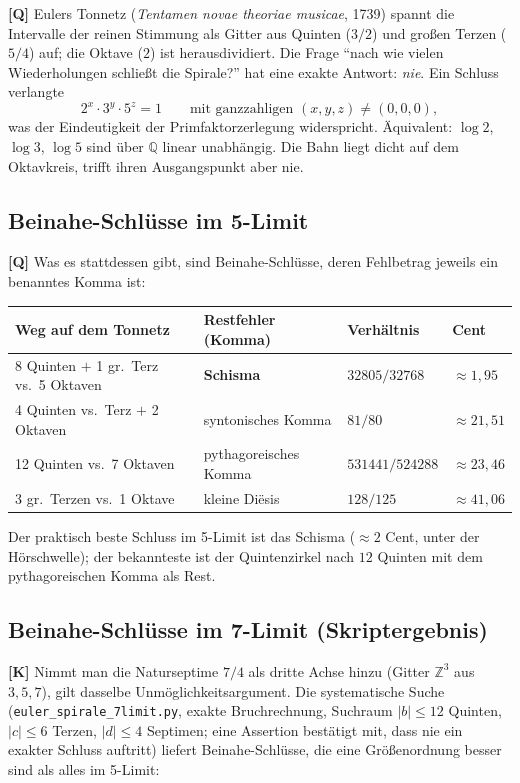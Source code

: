 \textbf{[Q]} Eulers Tonnetz (\emph{Tentamen novae theoriae musicae}, 1739)
spannt die Intervalle der reinen Stimmung als Gitter aus Quinten ($3/2$) und
gro\ss en Terzen ($5/4$) auf; die Oktave ($2$) ist herausdividiert. Die Frage
\enquote{nach wie vielen Wiederholungen schlie\ss t die Spirale?} hat eine
exakte Antwort: \emph{nie}. Ein Schluss verlangte
\[
  2^{x}\cdot 3^{y}\cdot 5^{z} = 1
  \qquad\text{mit ganzzahligen } (x,y,z)\neq(0,0,0),
\]
was der Eindeutigkeit der Primfaktorzerlegung widerspricht. \"Aquivalent:
$\log 2$, $\log 3$, $\log 5$ sind \"uber $\mathbb{Q}$ linear unabh\"angig. Die
Bahn liegt dicht auf dem Oktavkreis, trifft ihren Ausgangspunkt aber nie.

\subsection{Beinahe-Schl\"usse im 5-Limit}

\textbf{[Q]} Was es stattdessen gibt, sind Beinahe-Schl\"usse, deren
Fehlbetrag jeweils ein benanntes Komma ist:

\begin{center}
\begin{tabular}{llll}
\toprule
Weg auf dem Tonnetz & Restfehler (Komma) & Verh\"altnis & Cent \\
\midrule
8 Quinten $+$ 1 gr.~Terz vs.\ 5 Oktaven & \textbf{Schisma} & $32805/32768$ & $\approx 1{,}95$ \\
4 Quinten vs.\ Terz $+$ 2 Oktaven & syntonisches Komma & $81/80$ & $\approx 21{,}51$ \\
12 Quinten vs.\ 7 Oktaven & pythagoreisches Komma & $531441/524288$ & $\approx 23{,}46$ \\
3 gr.~Terzen vs.\ 1 Oktave & kleine Di\"esis & $128/125$ & $\approx 41{,}06$ \\
\bottomrule
\end{tabular}
\end{center}

Der praktisch beste Schluss im 5-Limit ist das Schisma ($\approx 2$ Cent,
unter der H\"orschwelle); der bekannteste ist der Quintenzirkel nach $12$
Quinten mit dem pythagoreischen Komma als Rest.

\subsection{Beinahe-Schl\"usse im 7-Limit (Skriptergebnis)}

\textbf{[K]} Nimmt man die Naturseptime $7/4$ als dritte Achse hinzu
(Gitter $\mathbb{Z}^3$ aus $3,5,7$), gilt dasselbe
Unm\"oglichkeitsargument. Die systematische Suche
(\texttt{euler\_spirale\_7limit.py}, exakte Bruchrechnung, Suchraum
$|b|\le 12$ Quinten, $|c|\le 6$ Terzen, $|d|\le 4$ Septimen; eine Assertion
best\"atigt mit, dass nie ein exakter Schluss auftritt) liefert
Beinahe-Schl\"usse, die eine Gr\"o\ss enordnung besser sind als alles im
5-Limit:

